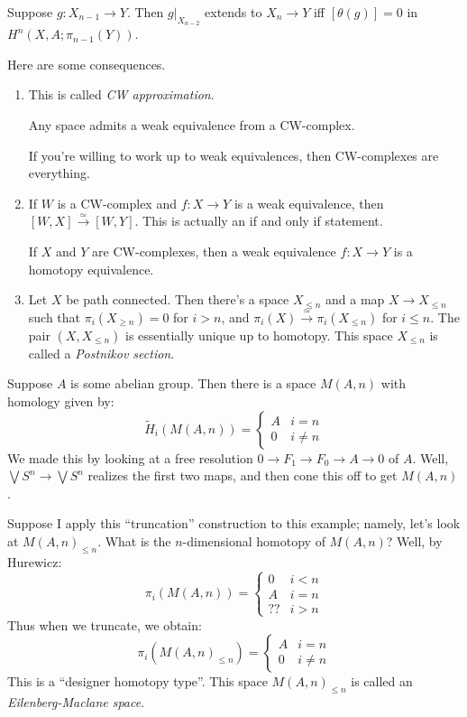\begin{prop}
    Suppose $g:X_{n-1}\to Y$. Then $g|_{X_{n-2}}$ extends to $X_n\to Y$ iff $[\theta(g)] = 0$ in $H^n(X,A;\pi_{n-1}(Y))$.
\end{prop}
Here are some consequences.
\begin{enumerate}
    \item This is called \emph{CW approximation}.
	\begin{theorem}
	    Any space admits a weak equivalence from a CW-complex.
	\end{theorem}
	If you're willing to work up to weak equivalences, then CW-complexes are everything.
    \item If $W$ is a CW-complex and $f:X\to Y$ is a weak equivalence, then $[W,X]\xrightarrow{\simeq}[W,Y]$. This is actually an if and only if statement.
	\begin{corollary}
	    If $X$ and $Y$ are CW-complexes, then a weak equivalence $f:X\to Y$ is a homotopy equivalence.
	\end{corollary}
    \item Let $X$ be path connected. Then there's a space $X_{\leq n}$ and a map $X\to X_{\leq n}$ such that $\pi_i(X_{\geq n}) = 0$ for $i>n$, and $\pi_i(X)\xrightarrow{\simeq}\pi_i(X_{\leq n})$ for $i\leq n$. The pair $(X,X_{\leq n})$ is essentially unique up to homotopy. This space $X_{\leq n}$ is called a \emph{Postnikov section}.
\end{enumerate}
Suppose $A$ is some abelian group. Then there is a space $M(A,n)$ with homology given by:
	\begin{equation*}
	    \widetilde{H}_i(M(A,n)) = \begin{cases}
		A & i = n\\
		0 & i\neq n
	    \end{cases}
	\end{equation*}
	We made this by looking at a free resolution $0\to F_1\to F_0\to A\to 0$ of $A$. Well, $\bigvee S^n\to \bigvee S^n$ realizes the first two maps, and then cone this off to get $M(A,n)$.

	Suppose I apply this ``truncation'' construction to this example; namely, let's look at $M(A,n)_{\leq n}$. What is the $n$-dimensional homotopy of $M(A,n)$? Well, by Hurewicz:
	\begin{equation*}
	    \pi_i(M(A,n)) = \begin{cases}
		0 & i<n\\
		A & i = n\\
		?? & i>n
	    \end{cases}
	\end{equation*}
	Thus when we truncate, we obtain:
	\begin{equation*}
	    \pi_i(M(A,n)_{\leq n}) = \begin{cases}
		A & i = n\\
		0 & i\neq n
	    \end{cases}
	\end{equation*}
	This is a ``designer homotopy type''. This space $M(A,n)_{\leq n}$ is called an \emph{Eilenberg-Maclane space}.

